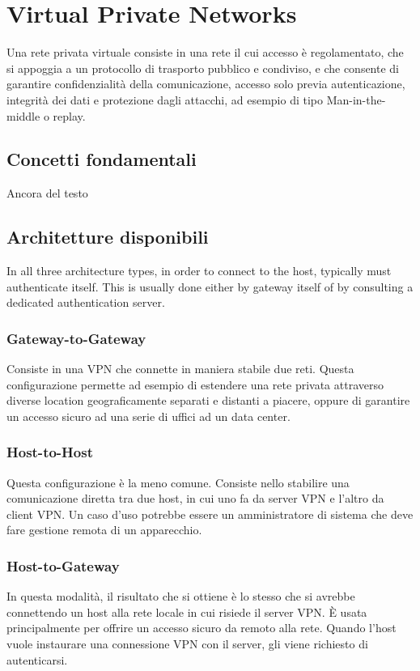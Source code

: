 \section{Virtual Private Networks }
Una rete privata virtuale consiste in una rete il cui accesso è regolamentato, che si appoggia a un protocollo di trasporto pubblico e condiviso, e che consente di garantire confidenzialità della comunicazione, accesso solo previa autenticazione, integrità dei dati e protezione dagli attacchi, ad esempio di tipo Man-in-the-middle o replay.


\subsection{Concetti fondamentali}
Ancora del testo

\subsection{Architetture disponibili}

In all three architecture types, in order to connect to the host, typically must authenticate itself. This is usually done either by gateway itself of by consulting a dedicated authentication server.

\subsubsection{Gateway-to-Gateway}
Consiste in una VPN che connette in maniera stabile due reti. Questa configurazione permette ad esempio di estendere una rete privata attraverso diverse location geograficamente separati e distanti a piacere, oppure di garantire un accesso sicuro ad una serie di uffici ad un data center.

\subsubsection{Host-to-Host}
Questa configurazione è la meno comune. Consiste nello stabilire una comunicazione diretta tra due host, in cui uno fa da server VPN e l'altro da client VPN. Un caso d'uso potrebbe essere un amministratore di sistema che deve fare gestione remota di un apparecchio.

\subsubsection{Host-to-Gateway}
In questa modalità, il risultato che si ottiene è lo stesso che si avrebbe connettendo un host alla rete locale in cui risiede il server VPN.
È usata principalmente per offrire un accesso sicuro da remoto alla rete. Quando l'host vuole instaurare una connessione VPN con il server, gli viene richiesto di autenticarsi.

